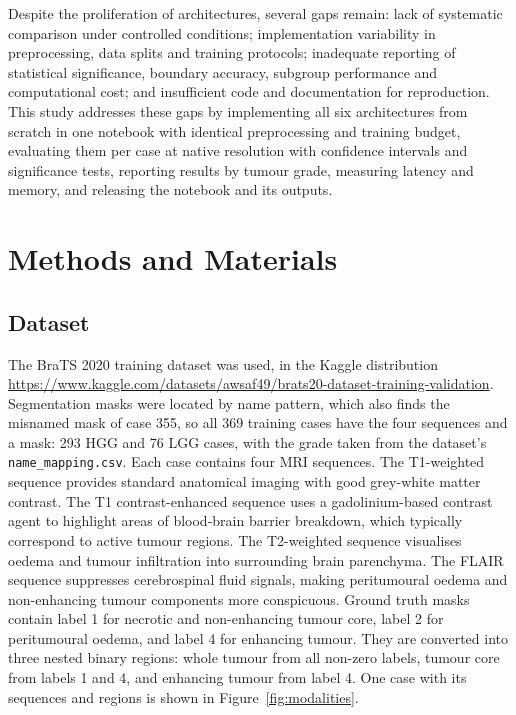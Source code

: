 \documentclass[a4paper,fleqn]{cas-sc}
\begin{document}
Despite the proliferation of architectures, several gaps remain: lack of systematic comparison under controlled conditions; implementation variability in preprocessing, data splits and training protocols; inadequate reporting of statistical significance, boundary accuracy, subgroup performance and computational cost; and insufficient code and documentation for reproduction. This study addresses these gaps by implementing all six architectures from scratch in one notebook with identical preprocessing and training budget, evaluating them per case at native resolution with confidence intervals and significance tests, reporting results by tumour grade, measuring latency and memory, and releasing the notebook and its outputs.

\section{Methods and Materials}
\label{sec:methods}

\subsection{Dataset}
\label{sec:dataset}

The BraTS 2020 training dataset \citep{menze2015,bakas2017,bakas2018} was used, in the Kaggle distribution \url{https://www.kaggle.com/datasets/awsaf49/brats20-dataset-training-validation}. Segmentation masks were located by name pattern, which also finds the misnamed mask of case 355, so all 369 training cases have the four sequences and a mask: 293 HGG and 76 LGG cases, with the grade taken from the dataset's \texttt{name\_mapping.csv}. Each case contains four MRI sequences. The T1-weighted sequence provides standard anatomical imaging with good grey-white matter contrast. The T1 contrast-enhanced sequence uses a gadolinium-based contrast agent to highlight areas of blood-brain barrier breakdown, which typically correspond to active tumour regions. The T2-weighted sequence visualises oedema and tumour infiltration into surrounding brain parenchyma. The FLAIR sequence suppresses cerebrospinal fluid signals, making peritumoural oedema and non-enhancing tumour components more conspicuous. Ground truth masks contain label 1 for necrotic and non-enhancing tumour core, label 2 for peritumoural oedema, and label 4 for enhancing tumour. They are converted into three nested binary regions: whole tumour from all non-zero labels, tumour core from labels 1 and 4, and enhancing tumour from label 4. One case with its sequences and regions is shown in Figure~\ref{fig:modalities}.
\end{document}
